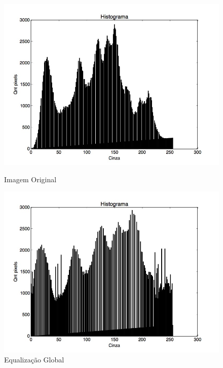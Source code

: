 \documentclass{article}
\begin{document}
\FloatBarrier
\begin{figure}[!htb]
\begin{minipage}[b]{0.45\linewidth}
\centering
\includegraphics[scale=0.25]{Histo_lena_B.jpg}
\caption{Imagem Original}
\label{fig:original}
\end{minipage}
\hspace{0.5cm}
\begin{minipage}[b]{0.45\linewidth}
\centering
\includegraphics[scale=0.25]{Histo_EqGlobal.jpg}
\caption{Equalização Global}
\label{fig:rota}
\end{minipage}
\end{figure}
\FloatBarrier
\end{document}
